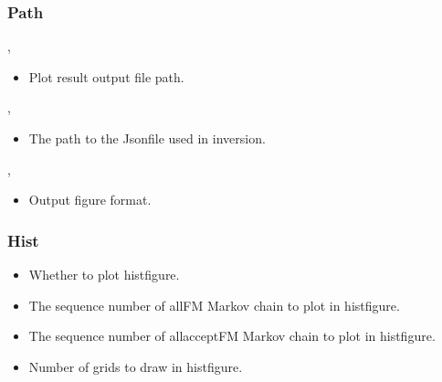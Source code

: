 \documentclass[a4paper,10pt,english,openany]{sphinxmanual}
\begin{document}
\subsubsection{Path}
\label{\detokenize{tutorials/S5_Plot_Result:path}}
,
\begin{itemize}
\item {} 
Plot result output file path.

\end{itemize}

,
\begin{itemize}
\item {} 
The path to the Json\sphinxhyphen{}file used in inversion.

\end{itemize}

,
\begin{itemize}
\item {} 
Output figure format.

\end{itemize}


\subsubsection{Hist}
\label{\detokenize{tutorials/S5_Plot_Result:hist}}
\begin{itemize}
\item {} 
Whether to plot hist\sphinxhyphen{}figure.

\end{itemize}

\begin{itemize}
\item {} 
The sequence number of all\sphinxhyphen{}FM Markov chain to plot in hist\sphinxhyphen{}figure.

\end{itemize}

\begin{itemize}
\item {} 
The sequence number of all\sphinxhyphen{}accept\sphinxhyphen{}FM Markov chain to plot in hist\sphinxhyphen{}figure.

\end{itemize}

\begin{itemize}
\item {} 
Number of grids to draw in hist\sphinxhyphen{}figure.

\end{itemize}
\end{document}
